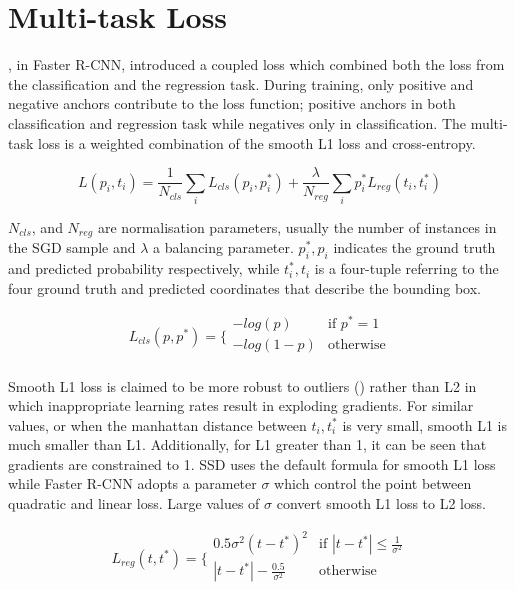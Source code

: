 \section{Multi-task Loss} 
\cite{ren2015faster}, in Faster R-CNN, introduced a coupled loss which combined both the loss from the classification and the regression task. During training, only positive and negative anchors contribute to the loss function; positive anchors in both classification and regression task while negatives only in classification.
The multi-task loss is a weighted combination of the smooth L1 loss and cross-entropy.

\begin{equation}
  L(p_i,t_i) = \frac{1}{N_{cls}}\sum_i{L_{cls}(p_i,p_i^*)}+ \frac{\lambda}{N_{reg}}\sum_i p_i^*{L_{reg}(t_i,t_i^*)}
\end{equation} 

$N_{cls}$, and $N_{reg}$ are normalisation parameters, usually the number of instances in the SGD sample and $\lambda$ a balancing parameter. $p_i^*, p_i$ indicates the ground truth and predicted probability respectively, while $t_i^*, t_i$ is a four-tuple referring to the four ground truth and predicted coordinates that describe the bounding box.

\begin{equation}
    L_{cls}(p,p^*)= \bigg\{
    \begin{array}{ll}
      -log(p) & \text{if } p^*=1 \\
      -log(1-p) &  \text{otherwise}\\
    \end{array}
\end{equation}

Smooth L1 loss is claimed to be more robust to outliers (\cite{ren2015faster}) rather than L2 in which inappropriate learning rates result in exploding gradients. For similar values, or when the manhattan distance between $t_i, t_i^*$ is very small, smooth L1 is much smaller than L1. Additionally, for L1 greater than 1, it can be seen that gradients are constrained to 1. SSD uses the default formula for smooth L1 loss while Faster R-CNN adopts a parameter $\sigma$ which control the point between quadratic and linear loss. Large values of $\sigma$ convert smooth L1 loss to L2 loss.

\begin{equation}
    L_{reg}(t,t^*)= \bigg\{
    \begin{array}{ll}
      0.5\sigma^2(t-t^*)^2 & \text{if } |t-t^*|\leq \frac{1}{\sigma^2} \\
      |t-t^*|-\frac{0.5}{\sigma^2} &  \text{otherwise} \\
    \end{array}
\end{equation}

